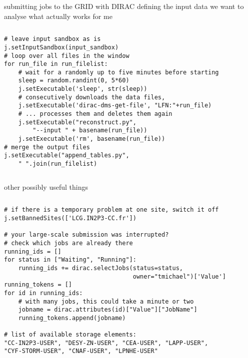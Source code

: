 \documentclass{beamer}
\begin{document}
\begin{frame}[fragile]{submitting jobs to the GRID with DIRAC}
                      {defining the input data we want to analyse}
    what actually works for me
    \begin{columns}
        \begin{lstlisting}[basicstyle=\scriptsize,firstnumber=38]
# leave input sandbox as is
j.setInputSandbox(input_sandbox)
# loop over all files in the window
for run_file in run_filelist:
    # wait for a randomly up to five minutes before starting
    sleep = random.randint(0, 5*60)
    j.setExecutable('sleep', str(sleep))
    # consecutively downloads the data files,
    j.setExecutable('dirac-dms-get-file', "LFN:"+run_file)
    # ... processes them and deletes them again
    j.setExecutable("reconstruct.py",
        "--input " + basename(run_file))
    j.setExecutable('rm', basename(run_file))
# merge the output files
j.setExecutable("append_tables.py",
    " ".join(run_filelist)
        \end{lstlisting}
    \end{columns}
\end{frame}



\begin{frame}[fragile]{other possibly useful things}
    \begin{columns}
        \begin{lstlisting}[basicstyle=\scriptsize,numbers=none]
# if there is a temporary problem at one site, switch it off
j.setBannedSites(['LCG.IN2P3-CC.fr'])

# your large-scale submission was interrupted?
# check which jobs are already there
running_ids = []
for status in ["Waiting", "Running"]:
    running_ids += dirac.selectJobs(status=status,
                                    owner="tmichael")['Value']
running_tokens = []
for id in running_ids:
    # with many jobs, this could take a minute or two
    jobname = dirac.attributes(id)["Value"]["JobName"]
    running_tokens.append(jobname)

# list of available storage elements:
"CC-IN2P3-USER", "DESY-ZN-USER", "CEA-USER", "LAPP-USER",
"CYF-STORM-USER", "CNAF-USER", "LPNHE-USER"
        \end{lstlisting}
    \end{columns}
\end{frame}
\end{document}
